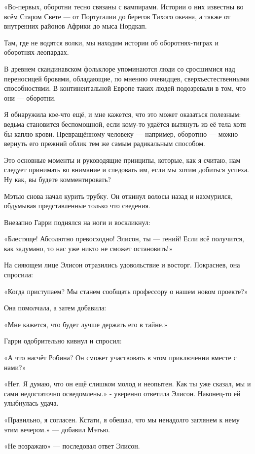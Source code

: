 \documentclass[a5paper, 9pt,
final, openany, twoside=true]{memoir}
\begin{document}
«Во-первых, оборотни тесно связаны с вампирами. Истории о них известны во всём Старом Свете — от Португалии до берегов Тихого океана, а также от внутренних районов Африки до мыса Нордкап.

Там, где не водятся волки, мы находим истории об оборотнях-тиграх и оборотнях-леопардах.

В древнем скандинавском фольклоре упоминаются люди со сросшимися над переносицей бровями, обладающие, по мнению очевидцев, сверхъестественными способностями. В континентальной Европе таких людей подозревали в том, что они — оборотни.

Я обнаружила кое-что ещё,  и мне кажется, что это может оказаться полезным: ведьма становится беспомощной, если кому-то удаётся вытянуть из её тела хотя бы каплю крови. Превращённому человеку — например, оборотню — можно вернуть его прежний облик тем же самым радикальным способом.

Это основные моменты и руководящие принципы, которые, как я считаю, нам следует принимать во внимание и следовать им, если мы хотим добиться успеха. Ну как, вы будете комментировать?\bigskip

Мэтью снова начал курить трубку. Он откинул волосы назад и нахмурился, обдумывая представленные только что сведения.\bigskip

Внезапно Гарри поднялся на ноги и воскликнул:

«Блестяще! Абсолютно превосходно! Элисон, ты — гений! Если всё получится, как задумано, то нас уже никто не сможет остановить!»

На сияющем лице Элисон отразились удовольствие и восторг. Покраснев, она спросила:

«Когда приступаем? Мы станем сообщать профессору о нашем новом проекте?»

Она помолчала, а затем добавила:

«Мне кажется, что будет лучше держать его в тайне.»

Гарри одобрительно кивнул и спросил:

«А что насчёт Робина? Он сможет участвовать в этом приключении вместе с нами?»

«Нет. Я думаю, что он ещё слишком молод и неопытен. Как ты уже сказал, мы и сами недостаточно осведомлены.» - уверенно ответила Элисон. Наконец-то ей улыбнулась удача.

«Правильно, я согласен. Кстати, я обещал, что мы ненадолго заглянем к нему этим вечером.» — добавил Мэтью.

«Не возражаю» — последовал ответ Элисон.\bigskip
\end{document}
